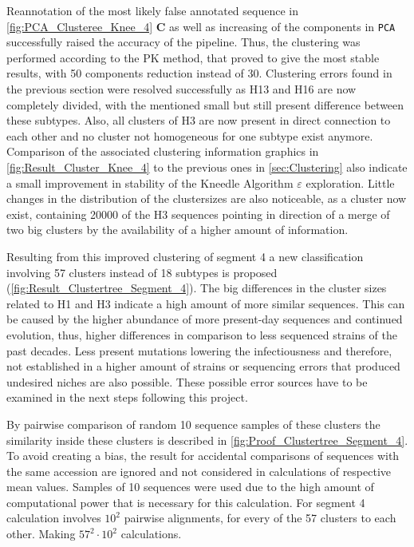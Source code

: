 Reannotation of the most likely false annotated sequence in \autoref{fig:PCA_Clusteree_Knee_4} \textbf{\textsf{C}} as well as increasing of the components in \texttt{PCA} successfully raised the accuracy of the pipeline. Thus, the clustering was performed according to the PK method, that proved to give the most stable results, with 50 components reduction instead of 30. Clustering errors found in the previous section were resolved successfully as H13 and H16 are now completely divided, with the mentioned small but still present difference between these subtypes. Also, all clusters of H3 are now present in direct connection to each other and no cluster not homogeneous for one subtype exist anymore. Comparison of the associated clustering information graphics in \autoref{fig:Result_Cluster_Knee_4} to the previous ones in \autoref{sec:Clustering} also indicate a small improvement in stability of the Kneedle Algorithm $\varepsilon$ exploration. Little changes in the distribution of the clustersizes are also noticeable, as a cluster now exist, containing 20000 of the H3 sequences pointing in direction of a merge of two big clusters by the availability of a higher amount of information.  

\vspace{1em}

Resulting from this improved clustering of segment 4 a new classification involving 57 clusters instead of 18 subtypes is proposed (\autoref{fig:Result_Clustertree_Segment_4}). The big differences in the cluster sizes related to H1 and H3 indicate a high amount of more similar sequences. This can be caused by the higher abundance of more present-day sequences and continued evolution, thus, higher differences in comparison to less sequenced strains of the past decades. Less present mutations lowering the infectiousness and therefore, not established in a higher amount of strains or sequencing errors that produced undesired niches are also possible. These possible error sources have to be examined in the next steps following this project.

\vspace{1em}

By pairwise comparison of random 10 sequence samples of these clusters the similarity inside these clusters is described in \autoref{fig:Proof_Clustertree_Segment_4}. To avoid creating a bias, the result for accidental comparisons of sequences with the same accession are ignored and not considered in calculations of respective mean values. Samples of 10 sequences were used due to the high amount of computational power that is necessary for this calculation. For segment 4 calculation involves $10^2$ pairwise alignments, for every of the 57 clusters to each other. Making $57^2\cdot 10^2$ calculations.

